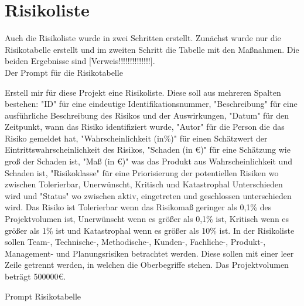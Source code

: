 \section{Risikoliste}  \label{CompRisikoliste}

Auch die Risikoliste wurde in zwei Schritten erstellt. Zunächst wurde nur die Risikotabelle erstellt und im zweiten 
Schritt die Tabelle mit den Maßnahmen. Die beiden Ergebnisse sind [Verweis!!!!!!!!!!!!!!].\\

Der Prompt für die Risikotabelle

\begin{prompt}[H]
    \begin{tcolorbox}[colback=gray!20, colframe=gray!20, boxrule=0pt, sharp corners] 
        Erstell mir für diese Projekt eine Risikoliste. Diese soll aus mehreren Spalten bestehen: "ID" für eine 
        eindeutige Identifikationsnummer, "Beschreibung" für eine ausführliche Beschreibung des Risikos und der 
        Auswirkungen, "Datum" für den Zeitpunkt, wann das Risiko identifiziert wurde, "Autor" für die Person die 
        das Risiko gemeldet hat, "Wahrscheinlichkeit (in\%)" für einen Schätzwert der Eintrittswahrscheinlichkeit 
        des Risikos, "Schaden (in €)" für eine Schätzung wie groß der Schaden ist, "Maß (in €)" was das Produkt aus 
        Wahrscheinlichkeit und Schaden ist, "Risikoklasse" für eine Priorisierung der potentiellen Risiken wo 
        zwischen Tolerierbar, Unerwünscht, Kritisch und Katastrophal Unterschieden wird und "Status" wo zwischen 
        aktiv, eingetreten und geschlossen unterschieden wird. Das Risiko ist Tolerierbar wenn das Risikomaß geringer 
        als 0,1\% des Projektvolumen ist, Unerwünscht wenn es größer als 0,1\% ist, Kritisch wenn es größer als 1\% 
        ist und Katastrophal wenn es größer als 10\% ist. In der Risikoliste sollen Team-, Technische-, Methodische-, 
        Kunden-, Fachliche-, Produkt-, Management- und Planungsrisiken betrachtet werden. Diese sollen mit einer 
        leer Zeile getrennt werden, in welchen die Oberbegriffe stehen. Das Projektvolumen beträgt 500000€.
        \vfill
    \end{tcolorbox}
    \caption{Prompt Risikotabelle}
    \label{Prompt Risikotabelle}
\end{prompt}

